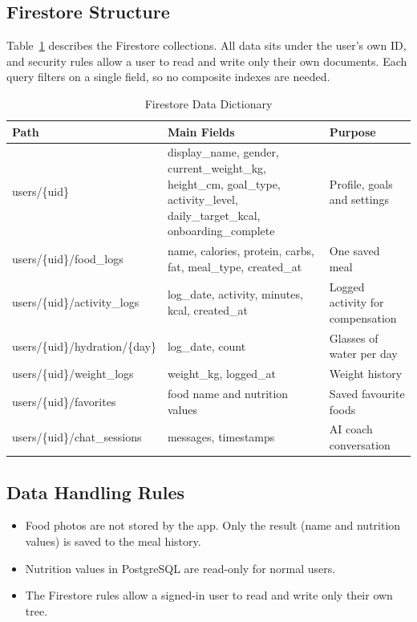 \subsection{Firestore Structure}
Table~\ref{tab:firestore} describes the Firestore collections. All data sits under the user's own ID, and
security rules allow a user to read and write only their own documents. Each query filters on a single
field, so no composite indexes are needed.

\begin{table}[H]
\centering
\caption{Firestore Data Dictionary}
\label{tab:firestore}
\small
\begin{tabularx}{\textwidth}{|>{\ttfamily\scriptsize\raggedright\arraybackslash}p{5.3cm}|>{\raggedright\arraybackslash}X|>{\raggedright\arraybackslash}p{3.0cm}|}
\hline
\textbf{Path} & \textbf{Main Fields} & \textbf{Purpose} \\ \hline
users/\{uid\} & display\_name, gender, current\_weight\_kg, height\_cm, goal\_type, activity\_level, daily\_target\_kcal, onboarding\_complete & Profile, goals and settings \\ \hline
users/\{uid\}/food\_logs & name, calories, protein, carbs, fat, meal\_type, created\_at & One saved meal \\ \hline
users/\{uid\}/activity\_logs & log\_date, activity, minutes, kcal, created\_at & Logged activity for compensation \\ \hline
users/\{uid\}/hydration/\{day\} & log\_date, count & Glasses of water per day \\ \hline
users/\{uid\}/weight\_logs & weight\_kg, logged\_at & Weight history \\ \hline
users/\{uid\}/favorites & food name and nutrition values & Saved favourite foods \\ \hline
users/\{uid\}/chat\_sessions & messages, timestamps & AI coach conversation \\ \hline
\end{tabularx}
\end{table}

\subsection{Data Handling Rules}
\begin{itemize}[noitemsep]
  \item Food photos are not stored by the app. Only the result (name and nutrition values) is saved to the
        meal history.
  \item Nutrition values in PostgreSQL are read-only for normal users.
  \item The Firestore rules allow a signed-in user to read and write only their own tree.
\end{itemize}

